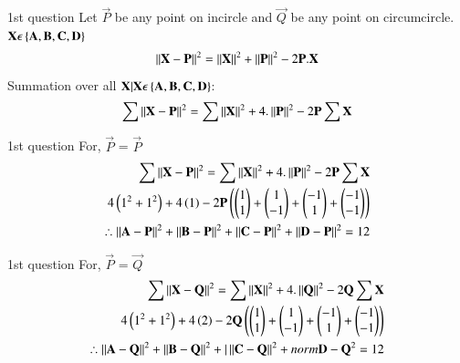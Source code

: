 \documentclass{beamer}
\begin{document}
\begin{frame}{1st question}
Let $\vec{P}$ be any point on incircle and $\vec{Q}$ be any point on circumcircle.\\
$\mathbf{X}\epsilon \left\{\mathbf{A,B,C,D}\right\}$
\begin{align}
    \left\lVert\mathbf{X}-\mathbf{P}\right\rVert^2 = \left\lVert\mathbf{X}\right\rVert^2 + \left\lVert\mathbf{P}\right\rVert^2 - 2\mathbf{P}.\mathbf{X}\\
\end{align}
Summation over all $\mathbf{X}|\mathbf{X}\epsilon \left\{\mathbf{A,B,C,D}\right\}$:
\begin{align}
    \sum \left\lVert\mathbf{X}-\mathbf{P}\right\rVert^2 = \sum \left\lVert\mathbf{X}\right\rVert^2 + 4.\left\lVert\mathbf{P}\right\rVert^2 -2\mathbf{P}\sum \mathbf{X}\\
\end{align}
\end{frame}

\begin{frame}{1st question}
For, $\vec{P}$ = $\vec{P}$
\begin{align}
    \sum \left\lVert\mathbf{X}-\mathbf{P}\right\rVert^2 = \sum \left\lVert\mathbf{X}\right\rVert^2 + 4.\left\lVert\mathbf{P}\right\rVert^2 -2\mathbf{P}\sum \mathbf{X}\\
    4\left(1^2+1^2\right) + 4\left(1\right)-2\mathbf{P}\left(\begin{pmatrix}1\\1\end{pmatrix}+\begin{pmatrix}1\\-1\end{pmatrix}+\begin{pmatrix}-1\\1\end{pmatrix}+\begin{pmatrix}-1\\-1\end{pmatrix}\right)\\
    \therefore \left\lVert\mathbf{A}-\mathbf{P}\right\rVert^2+\left\lVert\mathbf{B}-\mathbf{P}\right\rVert^2+\left\lVert\mathbf{C}-\mathbf{P}\right\rVert^2+\left\lVert\mathbf{D}-\mathbf{P}\right\rVert^2 = 12
\end{align}
\end{frame}

\begin{frame}{1st question}
For, $\vec{P}$ = $\vec{Q}$
\begin{align}
    \sum \left\lVert\mathbf{X}-\mathbf{Q}\right\rVert^2 = \sum \left\lVert\mathbf{X}\right\rVert^2 + 4.\left\lVert\mathbf{Q}\right\rVert^2 -2\mathbf{Q}\sum \mathbf{X}\\
    4\left(1^2+1^2\right) + 4\left(2\right)-2\mathbf{Q}\left(\begin{pmatrix}1\\1\end{pmatrix}+\begin{pmatrix}1\\-1\end{pmatrix}+\begin{pmatrix}-1\\1\end{pmatrix}+\begin{pmatrix}-1\\-1\end{pmatrix}\right)\\
    \therefore \left\lVert\mathbf{A}-\mathbf{Q}\right\rVert^2+\left\lVert\mathbf{B}-\mathbf{Q}\right\rVert^2+|\left\lVert\mathbf{C}-\mathbf{Q}\right\rVert^2+norm{\mathbf{D}-\mathbf{Q}}^2 = 12
\end{align}
\end{frame}
\end{document}
